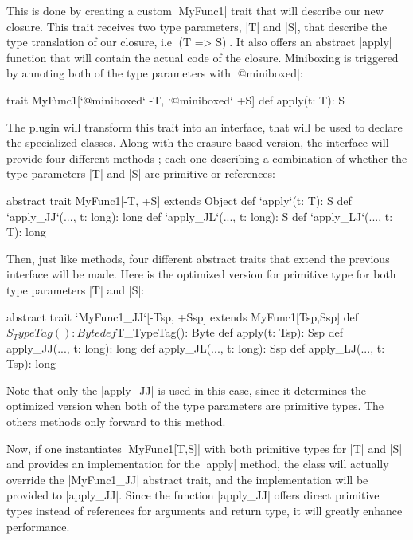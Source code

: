 This is done by creating a custom |MyFunc1| trait that will describe our new closure. This trait receives two type parameters, |T| and |S|, that describe the type translation of our closure, i.e |(T => S)|. It also offers an abstract |apply| function that will contain the actual code of the closure. Miniboxing is triggered by annoting both of the type parameters with |@miniboxed|:

\begin{lstlisting-nobreak}
 trait MyFunc1[`@miniboxed` -T, `@miniboxed` +S] {
   def apply(t: T): S
 }
\end{lstlisting-nobreak}

The plugin will transform this trait into an interface, that will be used to declare the specialized classes. Along with the erasure-based version, the interface will provide four different methods ; each one describing a combination of whether the type parameters |T| and |S| are primitive or references:

\begin{lstlisting-nobreak}
  abstract trait MyFunc1[-T, +S] extends Object {
    def `apply`(t: T): S
    def `apply_JJ`(..., t: long): long
    def `apply_JL`(..., t: long): S
    def `apply_LJ`(..., t: T): long
  }
\end{lstlisting-nobreak}

Then, just like methods, four different abstract traits that extend the previous interface will be made. Here is the optimized version for primitive type for both type parameters |T| and |S|:

\begin{lstlisting-nobreak}
  abstract trait `MyFunc1_JJ`[-Tsp, +Ssp]
        extends MyFunc1[Tsp,Ssp] {
    def $S_TypeTag(): Byte
    def $T_TypeTag(): Byte
    def apply(t: Tsp): Ssp
    def apply_JJ(..., t: long): long
    def apply_JL(..., t: long): Ssp
    def apply_LJ(..., t: Tsp): long
  }

\end{lstlisting-nobreak}

Note that only the |apply_JJ| is used in this case, since it determines the optimized version when both of the type parameters are primitive types. The others methods only forward to this method.

Now, if one instantiates |MyFunc1[T,S]| with both primitive types for |T| and |S| and provides an implementation for the |apply| method, the class will actually override the |MyFunc1_JJ| abstract trait, and the implementation will be provided to |apply_JJ|. Since the function |apply_JJ| offers direct primitive types instead of references for arguments and return type, it will greatly enhance performance.

